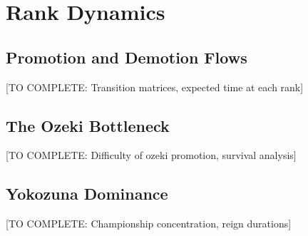 \section{Rank Dynamics}

\subsection{Promotion and Demotion Flows}

[TO COMPLETE: Transition matrices, expected time at each rank]

\subsection{The Ozeki Bottleneck}

[TO COMPLETE: Difficulty of ozeki promotion, survival analysis]

\subsection{Yokozuna Dominance}

[TO COMPLETE: Championship concentration, reign durations]